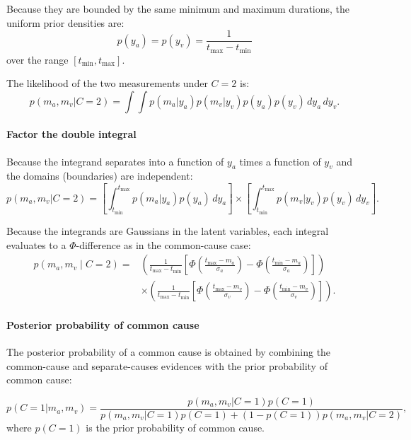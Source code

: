 \documentclass{jov}
\begin{document}
Because they are bounded by the same minimum and maximum durations, the uniform prior densities are:
\begin{equation}
p(y_a) = p(y_v) = \frac{1}{t_{\max} - t_{\min}}
\end{equation}
over the range $[t_{\min}, t_{\max}]$.

The likelihood of the two measurements under $C=2$ is:
\begin{equation}
p(m_a, m_v | C=2) = \int \int p(m_a | y_a) p(m_v | y_v) p(y_a) p(y_v) \, dy_a \, dy_v.
\end{equation}


\paragraph{Factor the double integral}

Because the integrand separates into a function of $y_a$ times a function of $y_v$ and the domains (boundaries) are independent:
\begin{equation}
p(m_a, m_v | C=2) = \left[\int_{t_{\min}}^{t_{\max}} p(m_a | y_a) p(y_a) \, dy_a\right] 
\times \left[\int_{t_{\min}}^{t_{\max}} p(m_v | y_v) p(y_v) \, dy_v\right].
\end{equation}

Because the integrands are Gaussians in the latent variables, each integral evaluates to a $\Phi$-difference as in the common-cause case:
\begin{align}
\label{eq:likelihood_c2_final}
p(m_a, m_v \mid C\!=\!2)
= &\left(\frac{1}{t_{\max} - t_{\min}} \left[\Phi\!\left(\frac{t_{\max} - m_a}{\sigma_a}\right) - \Phi\!\left(\frac{t_{\min} - m_a}{\sigma_a}\right)\right]\right) \\
 &\times \left(\frac{1}{t_{\max} - t_{\min}} \left[\Phi\!\left(\frac{t_{\max} - m_v}{\sigma_v}\right) - \Phi\!\left(\frac{t_{\min} - m_v}{\sigma_v}\right)\right]\right).
\end{align}

\paragraph{Posterior probability of common cause}

The posterior probability of a common cause is obtained by combining the common-cause and separate-causes evidences with the prior probability of common cause:

\begin{equation}
p(C=1 | m_a, m_v) = \frac{p(m_a, m_v | C=1) p(C=1)}{p(m_a, m_v | C=1) p(C=1) + (1 - p(C=1)) p(m_a, m_v | C=2)},
\end{equation}
where $p(C = 1)$ is the prior probability of common cause.
\end{document}
